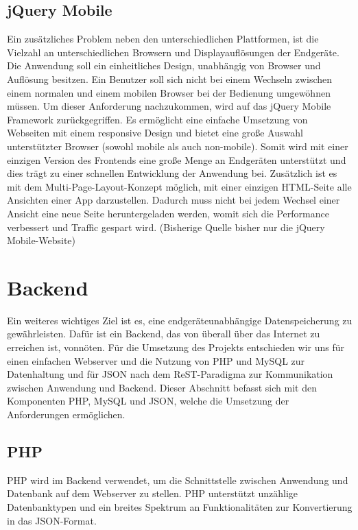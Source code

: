 \documentclass[10pt, conference, compsocconf]{IEEEtran}
\begin{document}
\subsection{jQuery Mobile}
Ein zus\"atzliches Problem neben den unterschiedlichen Plattformen, ist die Vielzahl an unterschiedlichen Browsern und Displayaufl\"osungen der Endger\"ate. 
Die Anwendung soll ein einheitliches Design, unabh\"angig von Browser und Aufl\"osung besitzen. 
Ein Benutzer soll sich nicht bei einem Wechseln zwischen einem normalen und einem mobilen Browser bei der Bedienung umgew\"ohnen m\"ussen. 
Um dieser Anforderung nachzukommen, wird auf das jQuery Mobile Framework zur\"uckgegriffen.
Es erm\"oglicht eine einfache Umsetzung von Webseiten mit einem responsive Design und bietet eine gro{\ss}e Auswahl unterst\"utzter Browser (sowohl mobile als auch non-mobile). 
Somit wird mit einer einzigen Version des Frontends eine gro{\ss}e Menge an Endger\"aten unterst\"utzt und dies tr\"agt zu einer schnellen Entwicklung der Anwendung bei. 
Zus\"atzlich ist es mit dem Multi-Page-Layout-Konzept m\"oglich, mit einer einzigen HTML-Seite alle Ansichten einer App darzustellen. Dadurch muss nicht bei jedem Wechsel einer Ansicht eine neue Seite heruntergeladen werden, womit sich die Performance verbessert und Traffic gespart wird. (Bisherige Quelle bisher nur die jQuery Mobile-Website)

\section{Backend}
Ein weiteres wichtiges Ziel ist es, eine endger\"ateunabh\"angige Datenspeicherung zu gew\"ahrleisten. 
Daf\"ur ist ein Backend, das von \"uberall \"uber das Internet zu erreichen ist, vonn\"oten. 
F\"ur die Umsetzung des Projekts entschieden wir uns f\"ur einen einfachen Webserver und die Nutzung von PHP und MySQL zur Datenhaltung und f\"ur JSON nach dem ReST-Paradigma zur Kommunikation zwischen Anwendung und Backend.  
Dieser Abschnitt befasst sich mit den Komponenten PHP, MySQL und JSON, welche die Umsetzung der Anforderungen erm\"oglichen.

\subsection{PHP}
PHP wird im Backend verwendet, um die Schnittstelle zwischen Anwendung und Datenbank auf dem Webserver zu stellen. PHP unterst\"utzt unz\"ahlige Datenbanktypen und ein breites Spektrum an Funktionalit\"aten zur Konvertierung in das JSON-Format.
\end{document}
